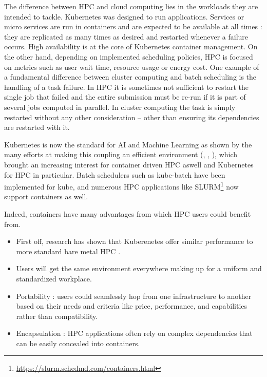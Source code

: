 The difference between HPC and cloud computing lies in the workloads they are
intended to tackle.  Kubernetes was designed to run applications. Services or
micro services are run in containers and are expected to be available at all
times : they are replicated as many times as desired and restarted whenever a
failure occurs. High availability is at the core of Kubernetes container
management.  On the other hand, depending on implemented scheduling policies,
HPC is focused on metrics such as user wait time, resource usage or energy
cost. One example of a fundamental difference between cluster computing and
batch scheduling is the handling of a task failure. In HPC it is sometimes not
sufficient to restart the single job that failed and the entire submission must
be re-run if it is part of several jobs computed in parallel. In cluster
computing the task is simply restarted without any other consideration -- other
than ensuring its dependencies are restarted with it.

Kubernetes is now the standard for AI and Machine Learning as shown by the many
efforts at making this coupling an efficient environment (\cite{lee2017design},
\cite{233001}, \cite{10.1145/3154842.3154845}), which brought an increasing
interest for container driven HPC aswell and Kubernetes for HPC in particular.
Batch schedulers such as
kube-batch have
been implemented for kube, and numerous HPC applications like
SLURM\footnote{\url{https://slurm.schedmd.com/containers.html}} now support
containers as well.

Indeed, containers have many advantages from which HPC users could benefit
from.
\begin{itemize}
	\item First off, research has shown that Kuberenetes offer similar
		performance to more standard bare metal HPC \cite{8950981}.
	\item Users will get the same environment everywhere making up for a
		uniform and standardized workplace.
	\item Portability : users could seamlessly hop from one infrastructure
		to another based on their needs and criteria like price,
		performance, and capabilities rather than compatibility.
	\item Encapsulation : HPC applications often rely on complex
		dependencies that can be easily concealed into containers.
\end{itemize}

